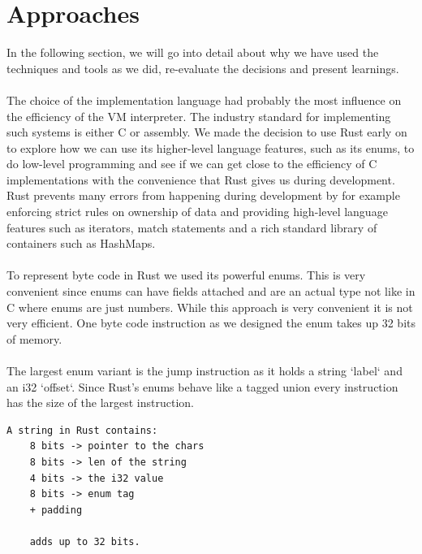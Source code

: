 \documentclass{article}
\begin{document}
\section{Approaches}
In the following section, we will go into detail about why we have used the 
techniques and tools as we did, re-evaluate the decisions and present 
learnings.
\\\\
The choice of the implementation language had probably the most influence on
the efficiency of the VM interpreter. The industry standard for implementing
such systems is either C or assembly. We made the decision to use Rust early on
to explore how we can use its higher-level language features, such as its
enums, to do low-level programming and see if we can get close to the
efficiency of C implementations with the convenience that Rust gives us during
development. Rust prevents many errors from happening during development by for
example enforcing strict rules on ownership of data and providing high-level
language features such as iterators, match statements and a rich standard
library of containers such as HashMaps.
\\\\
To represent byte code in Rust we used its powerful enums. This is very
convenient since enums can have fields attached and are an actual type not like
in C where enums are just numbers. While this approach is very convenient it is
not very efficient. One byte code instruction as we designed the enum takes up
32 bits of memory.
\\\\
The largest enum variant is the jump instruction as it holds a string `label`
and an i32 `offset`. Since Rust's enums behave like a tagged union every
instruction has the size of the largest instruction.

\begin{verbatim}
A string in Rust contains:
    8 bits -> pointer to the chars
    8 bits -> len of the string
    4 bits -> the i32 value
    8 bits -> enum tag
    + padding

    adds up to 32 bits.
\end{verbatim}
\end{document}
